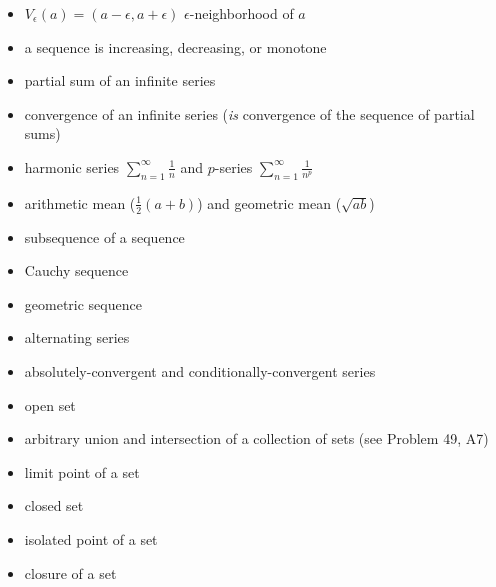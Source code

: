 \documentclass[12pt]{amsart}
\newcommand{\eps}{\epsilon}
\newcommand{\ds}{\displaystyle}
\begin{document}
\begin{itemize}
\item $V_\eps(a) = (a-\eps,a+\eps)$ \quad $\eps$-neighborhood of $a$
\item a sequence is increasing, decreasing, or monotone
\item partial sum of an infinite series
\item convergence of an infinite series (\emph{is} convergence of the sequence of partial sums)
\item harmonic series $\ds \sum_{n=1}^\infty \frac{1}{n}$ and $p$-series $\ds \sum_{n=1}^\infty \frac{1}{n^p}$
\item arithmetic mean ($\frac{1}{2}(a+b)$) and geometric mean ($\sqrt{ab}$)
\item subsequence of a sequence
\item Cauchy sequence
\item geometric sequence
\item alternating series
\item absolutely-convergent and conditionally-convergent series
\item open set
\item arbitrary union and intersection of a collection of sets (see Problem 49, A7)
\item limit point of a set
\item closed set
\item isolated point of a set
\item closure of a set
\end{itemize}


\newcommand{\pne}{\hfill {\footnotesize $\leftarrow$ \textbf{proof not expected}}}
\end{document}
